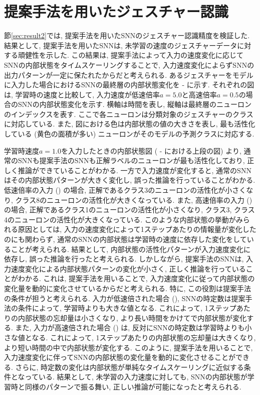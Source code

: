 \section{提案手法を用いたジェスチャー認識}
節\ref{sec:result2}では, 提案手法を用いたSNNのジェスチャー認識精度を検証した.
結果として, 提案手法を用いたSNNは, 未学習の速度のジェスチャーデータに対する頑健性を示した.
この結果は, 提案手法によって入力の速度変化に応じてSNNの内部状態をタイムスケーリングすることで, 入力速度変化によらずSNNの出力パターンが一定に保たれたからだと考えられる.
あるジェスチャーをモデルに入力した場合におけるSNNの最終層の内部状態変化を - に示す.
それぞれの図は, 学習時の速度と比較して, 入力速度が低速倍率$a=5.0$と高速倍率$a=0.5$の場合のSNNの内部状態変化を示す.
横軸は時間を表し, 縦軸は最終層のニューロンのインデックスを表す.
ここで各ニューロンは分類対象のジェスチャーのクラスに対応している.
また, 図における色は内部状態の値の大きさを表し, 最も活性化している (黄色の面積が多い) ニューロンがそのモデルの予測クラスに対応する.

学習時速度$a=1.0$を入力したときの内部状態図 ( - における上段の図) より, 通常のSNNも提案手法のSNNも正解ラベルのニューロンが最も活性化しており, 正しく推論ができていることがわかる.
一方で入力速度が変化すると, 通常のSNNはその内部状態パターンが大きく変化し, 誤った推論を行っていることがわかる.
低速倍率の入力 () の場合, 正解であるクラス3のニューロンの活性化が小さくなり, クラス8のニューロンの活性化が大きくなっている.
また, 高速倍率の入力 () の場合, 正解であるクラス1のニューロンの活性化が小さくなり, クラス3, クラス4のニューロンの活性化が大きくなっている.
このような内部状態の挙動がみられる原因としては, 入力の速度変化によって1ステップあたりの情報量が変化したのにも関わらず, 通常のSNNの内部状態は学習時の速度に依存した変化をしていることが考えられる.
結果として, 内部状態の活性化パターンが入力速度変化に依存し, 誤った推論を行ったと考えられる.
しかしながら, 提案手法のSNNは, 入力速度変化による内部状態パターンの変化が小さく, 正しく推論を行っていることがわかる.
これは, 提案手法を用いることで, 入力速度変化に従って内部状態の変化量を動的に変化させているからだと考えられる.
特に, この役割は提案手法の条件が担うと考えられる.
入力が低速倍された場合 (), SNNの時定数は提案手法の条件によって, 学習時よりも大きな値となる.
これによって, 1ステップあたりの内部状態の忘却量は小さくなり, より長い時間をかけてで内部状態が変化する.
また, 入力が高速倍された場合 () は, 反対にSNNの時定数は学習時よりも小さな値となる.
これによって, 1ステップあたりの内部状態の忘却量は大きくなり, より短い時間の中で内部状態が変化する.
このように, 提案手法を用いることで, 入力速度変化に伴ってSNNの内部状態の変化量を動的に変化させることができる.
さらに, 時定数の変化は内部状態が単純なタイムスケーリングに近似する条件となっている.
結果として, 未学習の入力速度に対しても, SNNの内部状態が学習時と同様のパターンで振る舞い, 正しい推論が可能になったと考えられる.

